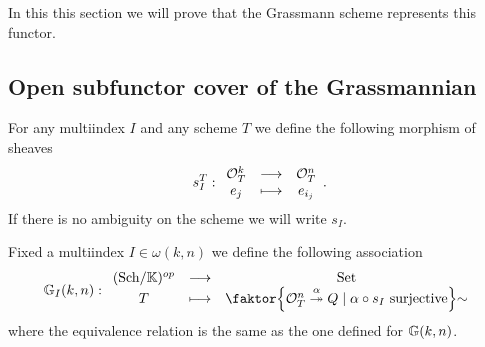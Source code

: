 \bigskip

\noindent In this this section we will prove that the Grassmann scheme represents this functor.

\subsection{Open subfunctor cover of the Grassmannian}
\begin{notation}
For any multiindex $I$ and any scheme $T$ we define the following morphism of sheaves
\[s_I^T:\begin{array}{ccc} {\mathcal{O}_T^k} & \longrightarrow & {\mathcal{O}_T^n}\\ {e_j} & \longmapsto & {e_{i_j}} \end{array}.\]
If there is no ambiguity on the scheme we will write $s_I$.
\end{notation}

\begin{definition}
Fixed a multiindex $I\in \omega(k,n)$ we define the following association
\[\G_I(k,n):\funcDef{(\Sch\K)\op}{\Set}{T}{\quot{\cpa{\Oc_T^n\overset{\al}\onto Q\mid \al\circ s_I\text{ surjective}}}\sim}\]
where the equivalence relation is the same as the one defined for $\mathbb{G}(k,n)$.
\end{definition}


